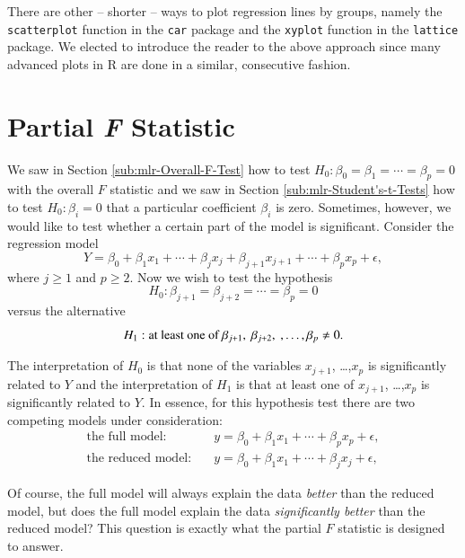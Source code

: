 \documentclass[captions=tableheading]{scrbook}
\begin{document}
There are other -- shorter -- ways to plot regression lines by groups, namely the \texttt{scatterplot} function in the \texttt{car} \cite{car} package and the \texttt{xyplot} function in the \texttt{lattice} package. We elected to introduce the reader to the above approach since many advanced plots in \textsf{R} are done in a similar, consecutive fashion.
\section{Partial \emph{F} Statistic}
\label{sec-12-7}

\label{sec:Partial-F-Statistic}

We saw in Section \ref{sub:mlr-Overall-F-Test} how to test \(H_{0}:\beta_{0}=\beta_{1}=\cdots=\beta_{p}=0\) with the overall \(F\) statistic and we saw in Section \ref{sub:mlr-Student's-t-Tests} how to test \(H_{0}:\beta_{i}=0\) that a particular coefficient \(\beta_{i}\) is zero. Sometimes, however, we would like to test whether a certain part of the model is significant. Consider the regression model
\begin{equation}
Y=\beta_{0}+\beta_{1}x_{1}+\cdots+\beta_{j}x_{j}+\beta_{j+1}x_{j+1}+\cdots+\beta_{p}x_{p}+\epsilon,
\end{equation}
where \(j\geq1\) and \(p\geq2\). Now we wish to test the hypothesis
\begin{equation}
H_{0}:\beta_{j+1}=\beta_{j+2}=\cdots=\beta_{p}=0
\end{equation}
versus the alternative 
\begin{equation}
H_{1}:\mbox{at least one of \ensuremath{\beta_{j+1},\ \beta_{j+2},\ ,\ldots,\beta_{p}\neq0}}.
\end{equation}

The interpretation of \(H_{0}\) is that none of the variables \(x_{j+1}\), \ldots{},\(x_{p}\) is significantly related to \(Y\) and the interpretation of \(H_{1}\) is that at least one of \(x_{j+1}\), \ldots{},\(x_{p}\) is significantly related to \(Y\). In essence, for this hypothesis test there are two competing models under consideration:
\begin{align}
\mbox{the full model:} & \quad y=\beta_{0}+\beta_{1}x_{1}+\cdots+\beta_{p}x_{p}+\epsilon,\\
\mbox{the reduced model:} & \quad y=\beta_{0}+\beta_{1}x_{1}+\cdots+\beta_{j}x_{j}+\epsilon,
\end{align}

Of course, the full model will always explain the data \emph{better} than the reduced model, but does the full model explain the data \emph{significantly better} than the reduced model? This question is exactly what the partial \(F\) statistic is designed to answer.
\end{document}

